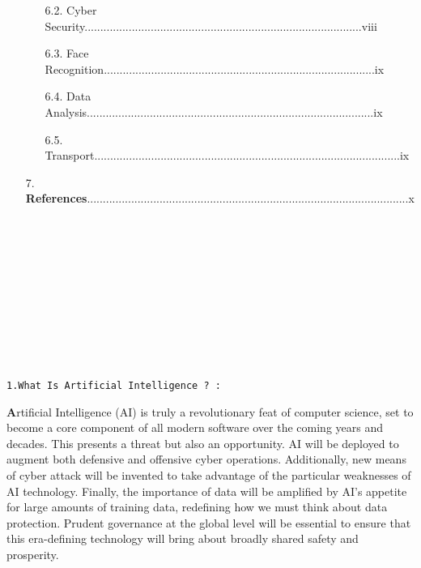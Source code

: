 \documentclass{article}
\begin{document}
\begin{itemize}
\begin{enumerate}
   \item[6.2.]Cyber Security........................................................................................viii
   \item[6.3.]Face Recognition......................................................................................ix
   \item[6.4.]Data Analysis...........................................................................................ix
   \item[6.5.]Transport.................................................................................................ix
\end{enumerate}
\item[7.]\textbf{References}......................................................................................................x
\\\\\\\\\\\\\\\\\\\\\\
\end{itemize}



\begin{large}
\texttt{1.What Is Artificial Intelligence ? :}\\
\end{large}

\textbf{\Huge A}rtificial Intelligence (AI) is truly a revolutionary feat of computer science, set to become a core component of all modern software over the coming years and decades. This presents a threat but also an opportunity. AI will be deployed to augment both defensive and offensive cyber operations. Additionally, new means of cyber attack will be invented to take advantage of the particular weaknesses of AI technology. Finally, the importance of data will be amplified by AI’s appetite for large amounts of training data, redefining how we must think about data protection. Prudent governance at the global level will be essential to ensure that this era-defining technology will bring about broadly shared safety and prosperity.\\\\
\end{document}
